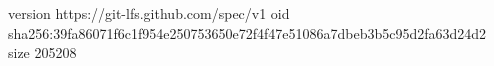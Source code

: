 version https://git-lfs.github.com/spec/v1
oid sha256:39fa86071f6c1f954e250753650e72f4f47e51086a7dbeb3b5c95d2fa63d24d2
size 205208
